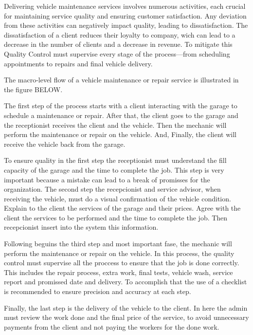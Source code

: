 Delivering vehicle maintenance services involves numerous activities, each crucial for maintaining service quality and ensuring customer satisfaction. 
Any deviation from these activities can negatively impact quality, leading to dissatisfaction. 
The dissatisfaction of a client reduces their loyalty to company, wich can lead to a decrease in the number of clients and a decrease in revenue. \cite{Setting_the_after_sale_process}
To mitigate this Quality Control must supervise every stage of the process—from scheduling appointments to repairs and final vehicle delivery. \cite{Setting_the_after_sale_process}

The macro-level flow of a vehicle maintenance or repair service is illustrated in the figure BELOW. 

The first step of the process starts with a client interacting with the garage to schedule a maintenance or repair. 
After that, the client goes to the garage and the receptionist receives the client and the vehicle.
Then the mechanic will perform the maintenance or repair on the vehicle.
And, Finally, the client will receive the vehicle back from the garage.

To ensure quality in the first step the receptionist must understand the fill capacity of the garage and the time to complete the job. 
This step is very important because a mistake can lead to a break of promisses for the organization. \cite{Setting_the_after_sale_process}
The second step the recepcionist and service advisor, when receiving the vehicle, must do a visual confirmation of the vehicle condition. \cite{Setting_the_after_sale_process}
Explain to the client the services of the garage and their prices. Agree with the client the services to be performed and the time to complete the job. 
Then recepcionist insert into the system this information. \cite{Setting_the_after_sale_process}

Following beguins the third step and most important fase, the mechanic will perform the maintenance or repair on the vehicle. 
In this process, the quality control must supervise all the proccess to ensure that the job is done correctly. \cite{Setting_the_after_sale_process}
This includes the repair process, extra work, final tests, vehicle wash, service report and promissed date and delivery. \cite{Setting_the_after_sale_process}
To accomplish that the use of a checklist is recommended to ensure precision and accuracy at each step. \cite{Setting_the_after_sale_process}

Finally, the last step is the delivery of the vehicle to the client. 
In here  the admin must review the work done and the final price of the service, to avoid unnecessary payments from the client and not paying the workers for the done work. \cite{Setting_the_after_sale_process}

